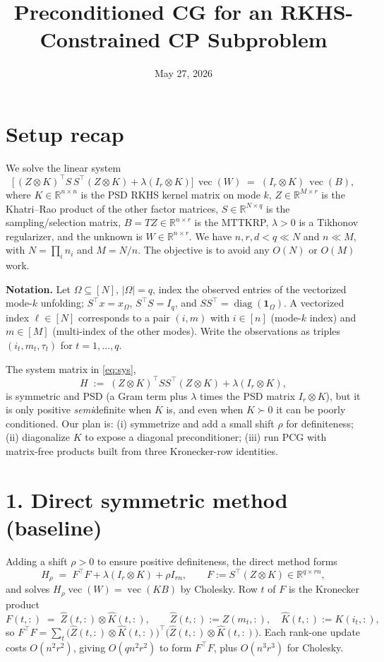 \documentclass[11pt]{article}
\title{Preconditioned CG for an RKHS-Constrained CP Subproblem}
\author{}
\date{May 27, 2026}
\newcommand{\R}{\mathbb{R}}
\newcommand{\vecop}{\operatorname{vec}}
\newcommand{\diag}{\operatorname{diag}}
\begin{document}
\maketitle

\section*{Setup recap}

We solve the linear system
\begin{equation}\label{eq:sys}
\bigl[\,(Z\otimes K)^{\!\top} S\,S^{\!\top}(Z\otimes K) + \lambda(I_r\otimes K)\bigr]\,\vecop(W)
 \;=\; (I_r\otimes K)\,\vecop(B),
\end{equation}
where $K\in\R^{n\times n}$ is the PSD RKHS kernel matrix on mode $k$,
$Z\in\R^{M\times r}$ is the Khatri--Rao product of the other factor matrices,
$S\in\R^{N\times q}$ is the sampling/selection matrix, $B=TZ\in\R^{n\times r}$
is the MTTKRP, $\lambda>0$ is a Tikhonov regularizer, and the unknown is
$W\in\R^{n\times r}$. We have $n,r,d<q\ll N$ and $n\ll M$, with
$N=\prod_i n_i$ and $M=N/n$. The objective is to avoid any $O(N)$ or $O(M)$
work.

\medskip
\noindent\textbf{Notation.} Let $\Omega\subseteq[N]$, $|\Omega|=q$, index the
observed entries of the vectorized mode-$k$ unfolding; $S^{\!\top}x=x_\Omega$,
$S^{\!\top}S=I_q$, and $SS^{\!\top}=\diag(\mathbf 1_\Omega)$. A vectorized index
$\ell\in[N]$ corresponds to a pair $(i,m)$ with $i\in[n]$ (mode-$k$ index) and
$m\in[M]$ (multi-index of the other modes). Write the observations as triples
$(i_t,m_t,\tau_t)$ for $t=1,\dots,q$.

The system matrix in \eqref{eq:sys},
\[
  H \;:=\; (Z\otimes K)^{\!\top}SS^{\!\top}(Z\otimes K)+\lambda(I_r\otimes K),
\]
is symmetric and PSD (a Gram term plus $\lambda$ times the PSD matrix
$I_r\otimes K$), but it is only positive \emph{semi}definite when $K$ is, and
even when $K\succ0$ it can be poorly conditioned. Our plan is: (i) symmetrize
and add a small shift $\rho$ for definiteness; (ii) diagonalize $K$ to expose a
diagonal preconditioner; (iii) run PCG with matrix-free products built from
three Kronecker-row identities.

\section*{1. Direct symmetric method (baseline)}

Adding a shift $\rho>0$ to ensure positive definiteness, the direct method
forms
\[
  H_\rho \;=\; F^{\!\top}F + \lambda(I_r\otimes K)+\rho I_{rn},
  \qquad F:=S^{\!\top}(Z\otimes K)\in\R^{q\times rn},
\]
and solves $H_\rho\vecop(W)=\vecop(KB)$ by Cholesky. Row $t$ of $F$ is the
Kronecker product
\[
  F(t,:)\;=\;\widehat Z(t,:)\otimes \widehat K(t,:),
  \qquad
  \widehat Z(t,:):=Z(m_t,:),\quad \widehat K(t,:):=K(i_t,:),
\]
so $F^{\!\top}F=\sum_t \bigl(\widehat Z(t,:)\otimes\widehat K(t,:)\bigr)^{\!\top}
\bigl(\widehat Z(t,:)\otimes\widehat K(t,:)\bigr)$. Each rank-one update costs
$O(n^2r^2)$, giving $O(qn^2r^2)$ to form $F^{\!\top}F$, plus $O(n^3r^3)$ for
Cholesky.
\end{document}
